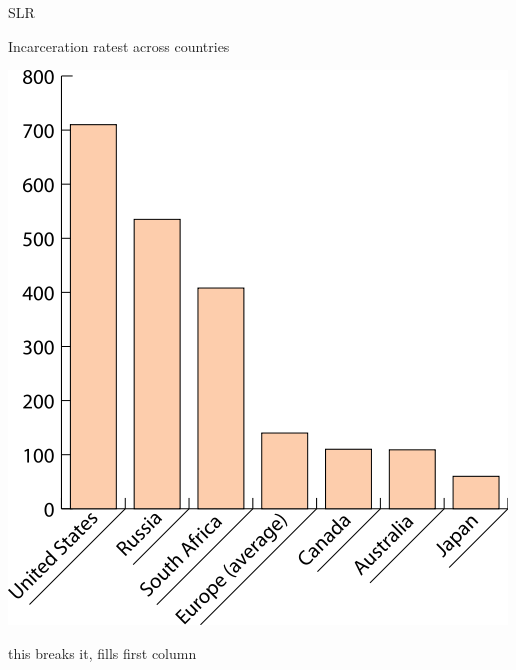 \begin{chart}{S}{LR}
\caption{Incarceration ratest across countries}
\label{chart:incarceration}
\includegraphics[width=\chartwidth,height=\chartheight]{incarceration}  
\end{chart}

\lipsum[1-2]
\lipsum[1-5] this breaks it, fills first column



